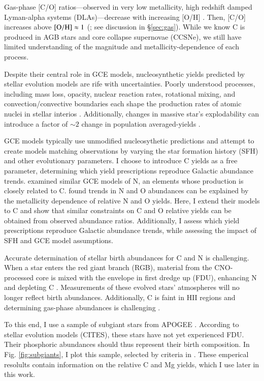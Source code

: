 \documentclass[12pt,oneside]{report}
\begin{document}
Gas-phase [C/O] ratios---observed in very low metallicity, high redshift damped Lyman-alpha systems (DLAs)---decrease with increasing [O/H] \citep{cooke+17}. Then, [C/O] increases above $\rm [O/H] \approx 1$ (\citealt{berg+19,nissen+14,fabbian+09}; see discussion in \S\ref{sec:gas}).
While we know C is produced in AGB stars and core collapse supernovae (CCSNe), we still have limited understanding of the magnitude and metallicity-dependence of each process.


Despite their central role in GCE models, nucleosynthetic yields predicted by stellar evolution models are rife with uncertainties. Poorly understood processes, including mass loss, opacity, nuclear reaction rates, rotational mixing, and convection/convective boundaries each shape the production rates of atomic nuclei in stellar interios \citep{KL14,ventura+13, LC18}.
Additionally, changes in massive star's explodability can introduce a factor of $\sim2$ change in population averaged-yields \citep{emily+21}.

GCE models typically use unmodified nucleosythetic predictions and attempt to create models matching observations by varying the star formation history (SFH) and other evolutionary parameters. I choose to introduce C yields as a free parameter, determining which yield prescriptions reproduce Galactic abundance trends.
\cite{james+22} examined similar GCE models of N, an elements whose production is closely related to C. \cite{james+22} found trends in N and O abundances can be explained by the metallicity dependence of relative N and O yields. Here, I extend their models to C and show that similar constraints on C and O relative yields can be obtained from observed abundance ratios. Additionally, I assess which yield prescriptions reproduce Galactic abundance trends, while assessing the impact of SFH and GCE model assumptions.

Accurate determination of stellar birth abundances for C and N is challenging. When a star enters the red giant branch (RGB), material from the CNO-processed core is mixed with the envelope in first dredge up (FDU), enhancing N and depleting C \citep{fiorenzo+21,KL14}. Measurements of these evolved stars'  atmospheres will no longer reflect birth abundances.  Additionally, C is faint in HII regions and determining gas-phase abundances is challenging \citep{skillman+20}.

To this end, I use a sample of subgiant stars from APOGEE \citep{apogee17}. According to stellar evolution models (CITES), these stars have not yet experienced FDU. Their phosphoric abundances should thus represent their birth composition.  In Fig. \ref{fig:subgiants}, I plot this sample, selected by criteria in \citet[see Appendix \ref{sec:jack}]{jack_subgiant}. These emperical resolults contain information on the relative C and Mg yields, which I use later in this work.
\end{document}
